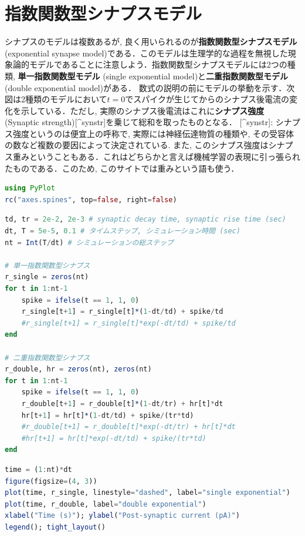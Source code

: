 \section{指数関数型シナプスモデル}
シナプスのモデルは複数あるが, 良く用いられるのが\textbf{指数関数型シナプスモデル}(exponential synapse model)である．このモデルは生理学的な過程を無視した現象論的モデルであることに注意しよう．指数関数型シナプスモデルには2つの種類, \textbf{単一指数関数型モデル} (single exponential model)と\textbf{二重指数関数型モデル} (double exponential model)がある．
数式の説明の前にモデルの挙動を示す．次図は2種類のモデルにおいて$t=0$でスパイクが生じてからのシナプス後電流の変化を示している．ただし, 実際のシナプス後電流はこれに\textbf{シナプス強度} (Synaptic strength)[^synstr]を乗じて総和を取ったものとなる．
[^synstr]: シナプス強度というのは便宜上の呼称で, 実際には神経伝達物質の種類や, その受容体の数など複数の要因によって決定されている. また, このシナプス強度はシナプス重みということもある．これはどちらかと言えば機械学習の表現に引っ張られたものである．このため, このサイトでは重みという語も使う．
\begin{lstlisting}[language=julia]
using PyPlot
rc("axes.spines", top=false, right=false)
\end{lstlisting}
\begin{lstlisting}[language=julia]
td, tr = 2e-2, 2e-3 # synaptic decay time, synaptic rise time (sec)
dt, T = 5e-5, 0.1 # タイムステップ, シミュレーション時間 (sec)
nt = Int(T/dt) # シミュレーションの総ステップ

# 単一指数関数型シナプス
r_single = zeros(nt)
for t in 1:nt-1
    spike = ifelse(t == 1, 1, 0)
    r_single[t+1] = r_single[t]*(1-dt/td) + spike/td
    #r_single[t+1] = r_single[t]*exp(-dt/td) + spike/td
end

# 二重指数関数型シナプス
r_double, hr = zeros(nt), zeros(nt)
for t in 1:nt-1
    spike = ifelse(t == 1, 1, 0)
    r_double[t+1] = r_double[t]*(1-dt/tr) + hr[t]*dt
    hr[t+1] = hr[t]*(1-dt/td) + spike/(tr*td)
    #r_double[t+1] = r_double[t]*exp(-dt/tr) + hr[t]*dt
    #hr[t+1] = hr[t]*exp(-dt/td) + spike/(tr*td)
end   
\end{lstlisting}
\begin{lstlisting}[language=julia]
time = (1:nt)*dt
figure(figsize=(4, 3))
plot(time, r_single, linestyle="dashed", label="single exponential")
plot(time, r_double, label="double exponential")
xlabel("Time (s)"); ylabel("Post-synaptic current (pA)")
legend(); tight_layout()
\end{lstlisting}
